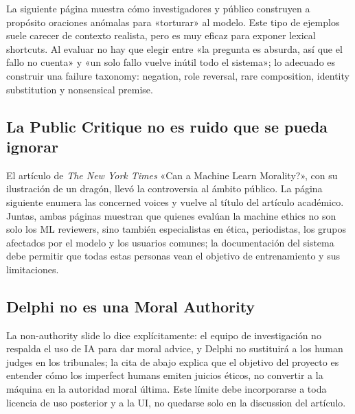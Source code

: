 La siguiente página muestra cómo investigadores y público construyen a propósito oraciones anómalas para «torturar» al modelo. Este tipo de ejemplos suele carecer de contexto realista, pero es muy eficaz para exponer lexical shortcuts. Al evaluar no hay que elegir entre «la pregunta es absurda, así que el fallo no cuenta» y «un solo fallo vuelve inútil todo el sistema»; lo adecuado es construir una failure taxonomy: negation, role reversal, rare composition, identity substitution y nonsensical premise.


\subsection{La Public Critique no es ruido que se pueda ignorar}

El artículo de \emph{The New York Times} «Can a Machine Learn Morality?», con su ilustración de un dragón, llevó la controversia al ámbito público. La página siguiente enumera las concerned voices y vuelve al título del artículo académico. Juntas, ambas páginas muestran que quienes evalúan la machine ethics no son solo los ML reviewers, sino también especialistas en ética, periodistas, los grupos afectados por el modelo y los usuarios comunes; la documentación del sistema debe permitir que todas estas personas vean el objetivo de entrenamiento y sus limitaciones.



\subsection{Delphi no es una Moral Authority}

La non-authority slide lo dice explícitamente: el equipo de investigación no respalda el uso de IA para dar moral advice, y Delphi no sustituirá a los human judges en los tribunales; la cita de abajo explica que el objetivo del proyecto es entender cómo los imperfect humans emiten juicios éticos, no convertir a la máquina en la autoridad moral última. Este límite debe incorporarse a toda licencia de uso posterior y a la UI, no quedarse solo en la discussion del artículo.

